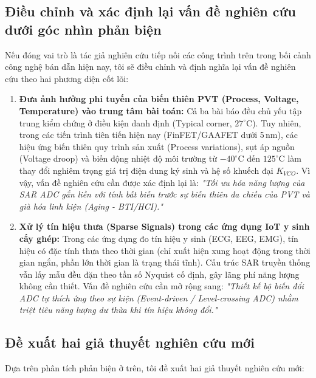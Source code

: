 \documentclass[12pt,a4paper]{article}
\begin{document}
\subsection{Điều chỉnh và xác định lại vấn đề nghiên cứu dưới góc nhìn phản biện}
Nếu đóng vai trò là tác giả nghiên cứu tiếp nối các công trình trên trong bối cảnh công nghệ bán dẫn hiện nay, tôi sẽ điều chỉnh và định nghĩa lại vấn đề nghiên cứu theo hai phương diện cốt lõi:

\begin{enumerate}
    \item \textbf{Đưa ảnh hưởng phi tuyến của biến thiên PVT (Process, Voltage, Temperature) vào trung tâm bài toán:}
    Cả ba bài báo đều chủ yếu tập trung kiểm chứng ở điều kiện danh định (Typical corner, $27^\circ\text{C}$). Tuy nhiên, trong các tiến trình tiên tiến hiện nay (FinFET/GAAFET dưới 5\,nm), các hiệu ứng biến thiên quy trình sản xuất (Process variations), sụt áp nguồn (Voltage droop) và biến động nhiệt độ môi trường từ $-40^\circ\text{C}$ đến $125^\circ\text{C}$ làm thay đổi nghiêm trọng giá trị điện dung ký sinh và hệ số khuếch đại $K_{VCO}$. Vì vậy, vấn đề nghiên cứu cần được xác định lại là: \textit{"Tối ưu hóa năng lượng của SAR ADC gắn liền với tính bất biến trước sự biến thiên đa chiều của PVT và già hóa linh kiện (Aging - BTI/HCI)."}
    \item \textbf{Xử lý tín hiệu thưa (Sparse Signals) trong các ứng dụng IoT y sinh cấy ghép:}
    Trong các ứng dụng đo tín hiệu y sinh (ECG, EEG, EMG), tín hiệu có đặc tính thưa theo thời gian (chỉ xuất hiện xung hoạt động trong thời gian ngắn, phần lớn thời gian là trạng thái tĩnh). Cấu trúc SAR truyền thống vẫn lấy mẫu đều đặn theo tần số Nyquist cố định, gây lãng phí năng lượng không cần thiết. Vấn đề nghiên cứu cần mở rộng sang: \textit{"Thiết kế bộ biến đổi ADC tự thích ứng theo sự kiện (Event-driven / Level-crossing ADC) nhằm triệt tiêu năng lượng dư thừa khi tín hiệu không đổi."}
\end{enumerate}

\subsection{Đề xuất hai giả thuyết nghiên cứu mới}

Dựa trên phân tích phản biện ở trên, tôi đề xuất hai giả thuyết nghiên cứu mới:
\end{document}
